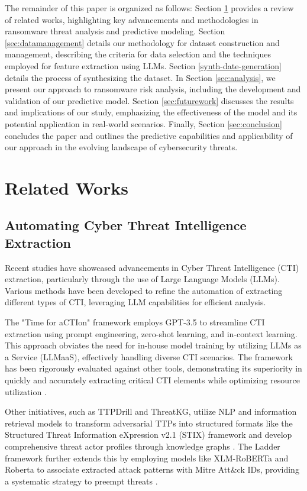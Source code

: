 \documentclass[running heads]{llncs}
\begin{document}
The remainder of this paper is organized as follows: Section \ref{sec:relatedworks} provides a review of related works, highlighting key advancements and methodologies in ransomware threat analysis and predictive modeling. Section \ref{sec:datamanagement} details our methodology for dataset construction and management, describing the criteria for data selection and the techniques employed for feature extraction using LLMs. Section \ref{synth-date-generation} details the process of synthesizing the dataset. In Section \ref{sec:analysis}, we present our approach to ransomware risk analysis, including the development and validation of our predictive model. Section \ref{sec:futurework} discusses the results and implications of our study, emphasizing the effectiveness of the model and its potential application in real-world scenarios. Finally, Section \ref{sec:conclusion} concludes the paper and outlines the predictive capabilities and applicability of our approach in the evolving landscape of cybersecurity threats.

\section{Related Works}
\label{sec:relatedworks}
\subsection{Automating Cyber Threat Intelligence Extraction}
Recent studies have showcased advancements in Cyber Threat Intelligence (CTI) extraction, particularly through the use of Large Language Models (LLMs). Various methods have been developed to refine the automation of extracting different types of CTI, leveraging LLM capabilities for efficient analysis.

The "Time for aCTIon" framework employs GPT-3.5 to streamline CTI extraction using prompt engineering, zero-shot learning, and in-context learning. This approach obviates the need for in-house model training by utilizing LLMs as a Service (LLMaaS), effectively handling diverse CTI scenarios. The framework has been rigorously evaluated against other tools, demonstrating its superiority in quickly and accurately extracting critical CTI elements while optimizing resource utilization \cite{aCTIon}.

Other initiatives, such as TTPDrill and ThreatKG, utilize NLP and information retrieval models to transform adversarial TTPs into structured formats like the Structured Threat Information eXpression  v2.1 (STIX) framework and develop comprehensive threat actor profiles through knowledge graphs \cite{TTPDrill, ThreatKG}. The Ladder framework further extends this by employing models like XLM-RoBERTa and Roberta to associate extracted attack patterns with Mitre Att\&ck IDs, providing a systematic strategy to preempt threats \cite{LADDER, mitre2023attack}.
\end{document}
